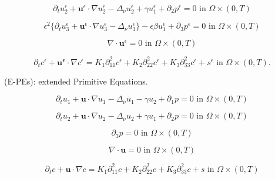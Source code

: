 \documentclass[11pt]{article}
\begin{document}
    \begin{equation} \label{ANSC2}
    \partial_t u_2^\epsilon + \mathbf{u}^\epsilon \cdot \nabla u_2^\epsilon -\Delta_\nu u_2^\epsilon + \gamma u_1^\epsilon   + \partial_2 p^\epsilon = 0 \text{ in } \Omega \times (0,T)
    \end{equation}
    
    \begin{equation} \label{ANSC3}
    \epsilon^2 \{  \partial_t u_3^\epsilon + \mathbf{u}^\epsilon \cdot \nabla u_3^\epsilon -\Delta_\nu u_3^{\epsilon} \} - \epsilon \beta u_1^\epsilon + \partial_3 p^\epsilon = 0 \text{ in } \Omega \times (0,T)
    \end{equation}
    
    \begin{equation} \label{ANSC4}
    \nabla \cdot \mathbf{u}^\epsilon= 0 \text{ in } \Omega \times (0,T)
    \end{equation}
    
    \begin{equation} \label{ANSC5}
    \partial_t c^\epsilon + \mathbf{u^\epsilon} \cdot \nabla c^\epsilon = K_1 \partial_{11} ^ 2 c^\epsilon + K_2 \partial_{22} ^ 2 c^\epsilon + K_3 \partial_{33} ^ 2 c^\epsilon + s^\epsilon \text{ in } \Omega \times (0,T).
    \end{equation}

(E-PEs): extended Primitive Equations.

    \begin{equation} \label{HNSC1}    
    \partial_t u_1 + \mathbf{u} \cdot \nabla u_1 - \Delta_\nu u_1 - \gamma u_2 + \partial_1 p = 0 \text{ in } \Omega \times (0,T)
    \end{equation}
    
    \begin{equation} \label{HNSC2}   
    \partial_t u_2 + \mathbf{u} \cdot \nabla u_2 - \Delta_\nu u_2 + \gamma u_1 + \partial_2 p = 0 \text{ in } \Omega \times (0,T)
    \end{equation}
    
    \begin{equation} \label{HNSC3}   
    \partial_3 p = 0 \text{ in } \Omega \times (0,T)
    \end{equation}
    
    \begin{equation} \label{HNSC4}   
    \nabla \cdot \mathbf{u} = 0 \text{ in } \Omega \times (0,T)
    \end{equation}
    
    \begin{equation} \label{HNSC5}   
    \partial_t c + \mathbf{u} \cdot \nabla c = K_1 \partial_{11} ^ 2 c + K_2 \partial_{22} ^ 2 c + K_3 \partial_{33} ^2 c + s \text{ in } \Omega \times (0,T)
    \end{equation}
\end{document}

